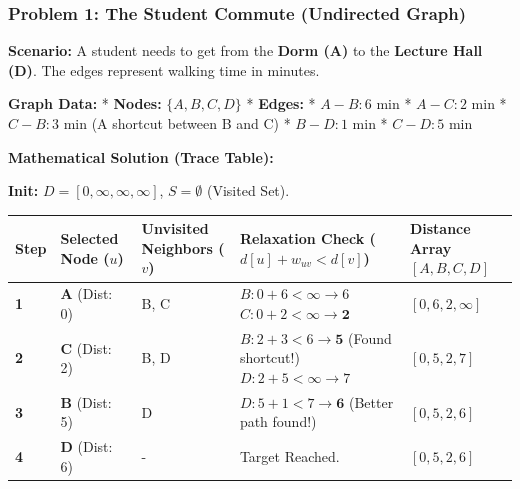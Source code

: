 \documentclass[
  letterpaper,
  DIV=11,
  numbers=noendperiod]{scrreprt}
\begin{document}
\subsubsection{Problem 1: The Student Commute (Undirected
Graph)}\label{problem-1-the-student-commute-undirected-graph}

\textbf{Scenario:} A student needs to get from the \textbf{Dorm (A)} to
the \textbf{Lecture Hall (D)}. The edges represent walking time in
minutes.

\textbf{Graph Data:} * \textbf{Nodes:} \(\{A, B, C, D\}\) *
\textbf{Edges:} * \(A-B: 6\) min * \(A-C: 2\) min * \(C-B: 3\) min (A
shortcut between B and C) * \(B-D: 1\) min * \(C-D: 5\) min

\textbf{Mathematical Solution (Trace Table):}

\textbf{Init:} \(D=[0, \infty, \infty, \infty]\), \(S=\emptyset\)
(Visited Set).

\begin{longtable}[]{@{}
  >{\raggedright\arraybackslash}p{}
  >{\raggedright\arraybackslash}p{}
  >{\raggedright\arraybackslash}p{}
  >{\raggedright\arraybackslash}p{}
  >{\raggedright\arraybackslash}p{}@{}}
\toprule\noalign{}
\begin{minipage}[b]{\linewidth}\raggedright
Step
\end{minipage} & \begin{minipage}[b]{\linewidth}\raggedright
Selected Node (\(u\))
\end{minipage} & \begin{minipage}[b]{\linewidth}\raggedright
Unvisited Neighbors (\(v\))
\end{minipage} & \begin{minipage}[b]{\linewidth}\raggedright
Relaxation Check (\(d[u] + w_{uv} < d[v]\))
\end{minipage} & \begin{minipage}[b]{\linewidth}\raggedright
Distance Array \([A, B, C, D]\)
\end{minipage} \\
\midrule\noalign{}
\endhead
\bottomrule\noalign{}
\endlastfoot
\textbf{1} & \textbf{A} (Dist: 0) & B, C &
\(B: 0+6 < \infty \to 6\)\(C: 0+2 < \infty \to \mathbf{2}\) &
\([0, 6, 2, \infty]\) \\
\textbf{2} & \textbf{C} (Dist: 2) & B, D & \(B: 2+3 < 6 \to \mathbf{5}\)
(Found shortcut!)\(D: 2+5 < \infty \to 7\) & \([0, 5, 2, 7]\) \\
\textbf{3} & \textbf{B} (Dist: 5) & D & \(D: 5+1 < 7 \to \mathbf{6}\)
(Better path found!) & \([0, 5, 2, 6]\) \\
\textbf{4} & \textbf{D} (Dist: 6) & - & Target Reached. &
\([0, 5, 2, 6]\) \\
\end{longtable}
\end{document}
